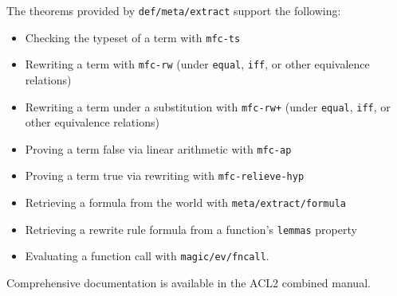 The theorems provided by \texttt{def\-/meta\-/extract} support the following:
\begin{itemize}
\item Checking the typeset of a term with \texttt{mfc-ts}
\item Rewriting a term with \texttt{mfc-rw}
  (under \texttt{equal}, \texttt{iff}, or other equivalence relations)
\item Rewriting a term under a substitution with \texttt{mfc-rw+}
  (under \texttt{equal}, \texttt{iff}, or other equivalence relations)
\item Proving a term false via linear arithmetic with \texttt{mfc-ap}
\item Proving a term true via rewriting with \texttt{mfc-relieve-hyp}
\item Retrieving a formula from the world with \texttt{meta\-/extract\-/formula}
\item Retrieving a rewrite rule formula from a function's \texttt{lemmas} property
\item Evaluating a function call with \texttt{magic\-/ev\-/fncall}.
\end{itemize}
Comprehensive documentation is available in the ACL2 combined manual.

